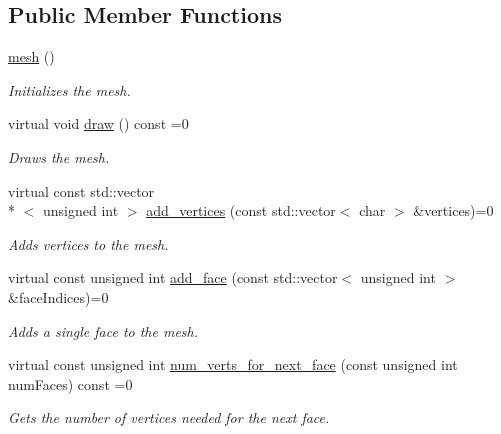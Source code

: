 \subsection*{Public Member Functions}
\begin{DoxyCompactItemize}
\item 
\hypertarget{classoccluded_1_1meshes_1_1mesh_a4249fa2a6e5482281aa7b4a48e8aa283}{\hyperlink{classoccluded_1_1meshes_1_1mesh_a4249fa2a6e5482281aa7b4a48e8aa283}{mesh} ()}\label{classoccluded_1_1meshes_1_1mesh_a4249fa2a6e5482281aa7b4a48e8aa283}

\begin{DoxyCompactList}\small\item\em Initializes the mesh. \end{DoxyCompactList}\item 
virtual void \hyperlink{classoccluded_1_1meshes_1_1mesh_ac9b5fa42ac4d6e2da862311058b664d6}{draw} () const =0
\begin{DoxyCompactList}\small\item\em Draws the mesh. \end{DoxyCompactList}\item 
virtual const std\+::vector\\*
$<$ unsigned int $>$ \hyperlink{classoccluded_1_1meshes_1_1mesh_ad015481328fc0ae9f72712f7f58ef1e3}{add\+\_\+vertices} (const std\+::vector$<$ char $>$ \&vertices)=0
\begin{DoxyCompactList}\small\item\em Adds vertices to the mesh. \end{DoxyCompactList}\item 
virtual const unsigned int \hyperlink{classoccluded_1_1meshes_1_1mesh_a4be1ad0c1b5144faa4f0e9a9c1d3023b}{add\+\_\+face} (const std\+::vector$<$ unsigned int $>$ \&face\+Indices)=0
\begin{DoxyCompactList}\small\item\em Adds a single face to the mesh. \end{DoxyCompactList}\item 
virtual const unsigned int \hyperlink{classoccluded_1_1meshes_1_1mesh_a70fbac683f8718017fde9236c7c0b156}{num\+\_\+verts\+\_\+for\+\_\+next\+\_\+face} (const unsigned int num\+Faces) const =0
\begin{DoxyCompactList}\small\item\em Gets the number of vertices needed for the next face. \end{DoxyCompactList}\end{DoxyCompactItemize}


